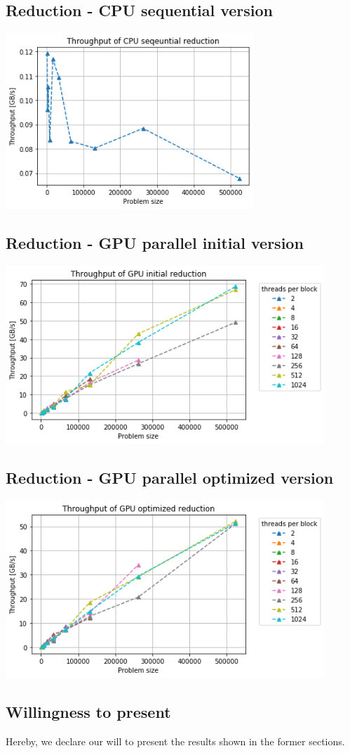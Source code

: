 \documentclass[12pt]{article}
\begin{document}
\vspace{10pt}

\subsection{Reduction - CPU sequential version}
\includegraphics[width=0.7\textwidth]{cpu_sequtential.png}


\subsection{Reduction - GPU parallel initial version}
\includegraphics[width=0.9\textwidth]{gpu_initial.png}

\subsection{Reduction - GPU parallel optimized version}
\includegraphics[width=0.9\textwidth]{gpu_optimized.png}

\subsection{Willingness to present}
Hereby, we declare our will to present the results shown in the former sections.
\end{document}
